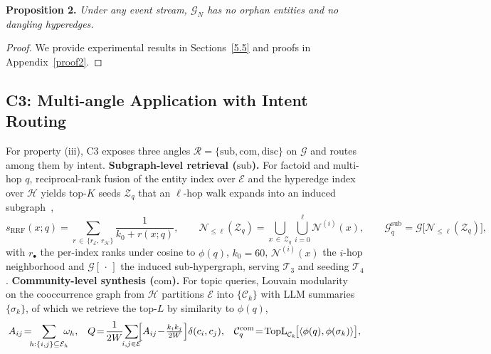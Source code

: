 \documentclass{article}
\begin{document}
\textbf{Proposition 2.} \textit{Under any event stream, $\mathcal{G}_N$ has no orphan entities and no dangling hyperedges.}\nopagebreak[4]\vspace{-2mm}\nopagebreak[4]
\begin{proof}
We provide experimental results in Sections~\ref{5.5} and proofs in Appendix~\ref{proof2}.
\end{proof}

\subsection{C3: Multi-angle Application with Intent Routing}\label{sec:c3}

For property (iii), C3 exposes three angles $\mathcal{R}\!=\!\{\mathrm{sub},\mathrm{com},\mathrm{disc}\}$ on $\mathcal{G}$ and routes among them by intent. \textbf{Subgraph-level retrieval ($\mathrm{sub}$).} For factoid and multi-hop $q$, reciprocal-rank fusion of the entity index over $\mathcal{E}$ and the hyperedge index over $\mathcal{H}$ yields top-$K$ seeds $\mathcal{Z}_q$ that an $\ell$-hop walk expands into an induced subgraph~\citep{PathRAG,HippoRAG2},
\begin{equation}
s_{\mathrm{RRF}}(x;q)\!=\!\!\!\!\sum_{r\,\in\,\{r_{\mathcal{E}},\,r_{\mathcal{H}}\}}\!\!\!\frac{1}{k_0\!+\!r(x;q)},\qquad
\mathcal{N}_{\leq\ell}(\mathcal{Z}_q)\!=\!\!\!\bigcup_{x\,\in\,\mathcal{Z}_q}\!\bigcup_{i=0}^{\ell}\!\mathcal{N}^{(i)}(x),\qquad
\mathcal{G}_q^{\mathrm{sub}}\!=\!\mathcal{G}\!\bigl[\mathcal{N}_{\leq\ell}(\mathcal{Z}_q)\bigr],
\label{eq:sub}
\end{equation}
with $r_{\bullet}$ the per-index ranks under cosine to $\phi(q)$, $k_0\!=\!60$, $\mathcal{N}^{(i)}(x)$ the $i$-hop neighborhood and $\mathcal{G}[\,\cdot\,]$ the induced sub-hypergraph, serving $\mathcal{T}_3$ and seeding $\mathcal{T}_4$. \textbf{Community-level synthesis ($\mathrm{com}$).} For topic queries, Louvain modularity~\citep{Louvain} on the cooccurrence graph from $\mathcal{H}$ partitions $\mathcal{E}$ into $\{\mathcal{C}_k\}$ with LLM summaries $\{\sigma_k\}$, of which we retrieve the top-$L$ by similarity to $\phi(q)$,
\begin{equation}
A_{ij}\!=\!\!\!\sum_{h:\{i,j\}\subseteq\mathcal{E}_h}\!\!\!\!\omega_h,\;\;\;
Q\!=\!\frac{1}{2W}\!\!\sum_{i,j\in\mathcal{E}}\!\!\Bigl[A_{ij}\!-\!\tfrac{k_i k_j}{2W}\Bigr]\delta(c_i,c_j),\;\;\;
\mathcal{C}_q^{\mathrm{com}}\!=\!\mathrm{TopL}_{\mathcal{C}_k}\!\bigl[\langle\phi(q),\phi(\sigma_k)\rangle\bigr],
\label{eq:com}
\end{equation}
\end{document}

